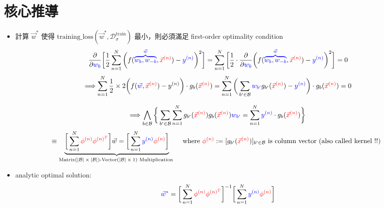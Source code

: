 \documentclass{article}
\begin{document}
\begin{CJK}{UTF8}{bsmi}
\begin{itemize}
\end{itemize}

\newpage 
\section{核心推導}
\begin{itemize}
\item 計算 $\vec{w}^{*}$ 使得  $\text{training\_loss$(\vec{w}^{*},\mathcal{D}^{\text{train}}_{\sigma})$}$ 最小，則必須滿足 first-order optimality condition 
$$  \frac{\partial}{\partial \color{blue}w_b} \bigg[ \frac{1}{2}  \sum_{n=1}^{N}   \bigg(f({\color{blue}\overbrace{w_b,w_{-b}}^{\vec{w}}},{\color{red}\vec{x}^{(n)}}) - {\color{blue}y^{(n)} }\bigg)^2 \bigg] =\sum_{n=1}^{N}\bigg[ \frac{1}{2} \cdot \frac{\partial}{\partial \color{blue}w_b}  \bigg(f({\color{blue}\overbrace{w_b,w_{-b}}^{\vec{w}}},{\color{red}\vec{x}^{(n)}}) - {\color{blue}y^{(n)} }\bigg)^2 \bigg] = 0 $$ $$\Longrightarrow \sum_{n=1}^{N} \frac{1}{2} \times 2\bigg( f({\color{blue}\vec{w}},{\color{red}\vec{x}^{(n)}}) - y^{(n)} \bigg)\cdot g_b({\color{red}\vec{x}^{(n)}}) = \sum_{n=1}^{N} \bigg( \sum_{b' \in \mathcal{B}} {\color{blue}w_{b'}} g_{b'}({\color{red}\vec{x}^{(n)}}) - {\color{blue} y^{(n)}} \bigg) \cdot g_{b}({\color{red}\vec{x}^{(n)}})   = 0 $$

$$ \Longrightarrow  \bigwedge_{b \in \mathcal{B}} \bigg\{ \sum_{b' \in \mathcal{B}}   \sum_{n=1}^{N}g_{b'}({\color{red}\vec{x}^{(n)}})g_{b}({\color{red}\vec{x}^{(n)}}) {\color{blue}w_{b'}} = \sum_{n=1}^{N}  {\color{blue}y^{(n)}} \cdot  g_{b}({\color{red}\vec{x}^{(n)}}) \bigg\} $$ $$ \equiv \underbrace{  \bigg[\sum_{n=1}^{N} {\color{red}\phi^{(n)}\phi^{(n)^T}} \bigg] \vec{w} = \bigg[\sum_{n=1}^{N} {\color{blue}y^{(n)}} {\color{red}\phi^{(n)}} \bigg]}_{\text{Matrix$(|\mathcal{B}| \times |\mathcal{B}|)$-Vector$(|\mathcal{B}| \times 1)$ Multiplication }} \quad \text{where } {\color{red}\phi^{(n)}} := [g_{b'}({\color{red}\vec{x}^{(n)}})]_{b' \in \mathcal{B}} \text{ is column vector (also called kernel !!) }   $$

\item analytic optimal solution:
$$ {\color{blue} \vec{w}^{*}} =   \bigg[\sum_{n=1}^{N} {\color{red}\phi^{(n)}\phi^{(n)^T}} \bigg]^{-1}\bigg[\sum_{n=1}^{N} {\color{blue}y^{(n)}} {\color{red}\phi^{(n)}} \bigg]   $$

\end{itemize}

\end{CJK}
\end{document}
